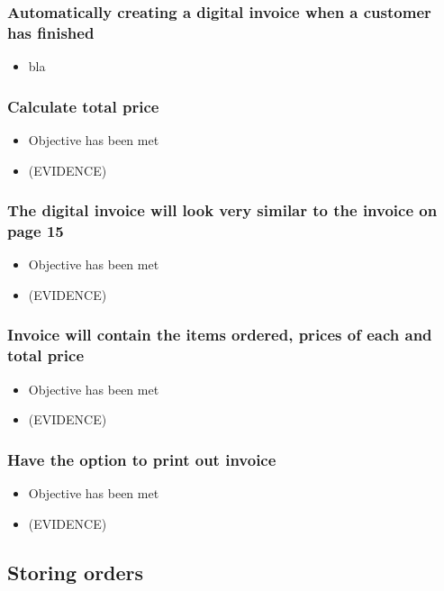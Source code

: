 \subsubsection{Automatically creating a digital invoice when a customer has finished}
\begin{itemize}
	\item bla
\end{itemize}

\subsubsection{Calculate total price}
\begin{itemize}
	\item Objective has been met
	\item (EVIDENCE)
\end{itemize}

\subsubsection{The digital invoice will look very similar to the invoice on page 15}
\begin{itemize}
	\item Objective has been met
	\item (EVIDENCE)
\end{itemize}

\subsubsection{Invoice will contain the items ordered, prices of each and total price}
\begin{itemize}
	\item Objective has been met
	\item (EVIDENCE)
\end{itemize}

\subsubsection{Have the option to print out invoice}
\begin{itemize}
	\item Objective has been met
	\item (EVIDENCE)
\end{itemize}

\subsection{Storing orders}

